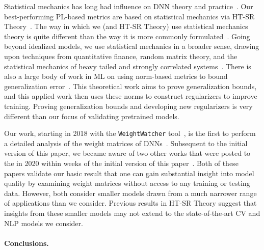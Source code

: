 Statistical mechanics has long had influence on DNN theory and practice~\cite{EB01_BOOK, MM17_TR, BKPx20}.
Our best-performing PL-based metrics are based on statistical mechanics via HT-SR Theory~\cite{MM17_TR, MM18_TR, MM19_HTSR_ICML, MM19_KDD, MM20_SDM}.
The way in which we (and HT-SR Theory) use statistical mechanics theory is quite different than the way it is more commonly formulated~\cite{EB01_BOOK, BKPx20}.
Going beyond idealized models, we use statistical mechanics in a broader sense, drawing upon techniques from quantitative finance, random matrix theory, and the statistical mechanics of heavy tailed and strongly correlated systems~\cite{BouchaudPotters03, SornetteBook, BP11, bun2017}.
There is also a large body of work in ML on using norm-based metrics to bound generalization error~\cite{NTS15, BFT17_TR, LMBx18_TR}.
This theoretical work aims to prove generalization bounds, and this applied work then uses these norms to construct regularizers to improve training.
Proving generalization bounds and developing new regularizers is very different than our focus of validating pretrained models.


Our work, starting in 2018 with the \texttt{WeightWatcher} tool~\cite{weightwatcher_package}, is the first to perform a detailed analysis of the weight matrices of DNNs~\cite{MM18_TR, MM19_HTSR_ICML, MM20_SDM}.
Subsequent to the initial version of this paper, we became aware of two other works that were posted to the in 2020 within weeks of the initial version of this paper~\cite{EJRUY20_TR,UKGBT20_TR}.
Both of these papers validate our basic result that one can gain substantial insight into model quality by examining weight matrices without access to any training or testing data.
However, both consider smaller models drawn from a much narrower range of applications than we consider.
Previous results in HT-SR Theory suggest that insights from these smaller models may not extend to the state-of-the-art CV and NLP models we consider.


\paragraph{Conclusions.}

